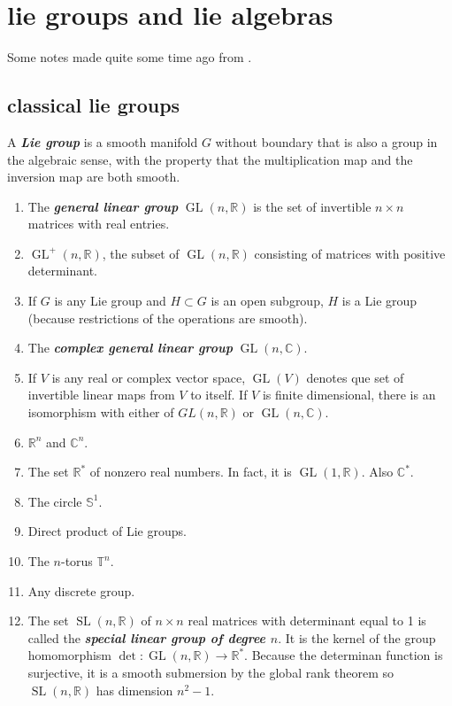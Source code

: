 \chapter{lie groups and lie algebras}

Some notes made quite some time ago from  \cite{les}.

\section{classical lie groups}
\begin{defn}
	A \textbf{\textit{Lie group}} is a smooth manifold $G$ without boundary that is also a group in the algebraic sense, with the property that the multiplication map and the inversion map are both smooth.
\end{defn}
\begin{example}\leavevmode
	\begin{enumerate}
		\item The \textbf{\textit{general linear group}} $\operatorname{GL}(n,\mathbb{R})$ is the set of invertible $n\times n$ matrices with real entries.
		\item $\operatorname{GL}^+(n,\mathbb{R})$, the subset of $\operatorname{GL}(n,\mathbb{R})$ consisting of matrices with positive determinant.
		\item If $G$ is any Lie group and $H\subset G$ is an open subgroup, $H$ is a Lie group (because restrictions of the operations are smooth).
		\item The \textbf{\textit{complex general linear group}} $\operatorname{GL}(n,\mathbb{C})$.
		\item If $V$ is any real or complex vector space, $\operatorname{GL}(V)$ denotes que set of invertible linear maps from $V$ to itself. If $V$ is finite dimensional, there is an isomorphism with either of $GL(n,\mathbb{R})$ or $\operatorname{GL}(n,\mathbb{C})$.
		\item $\mathbb{R}^n$ and $\mathbb{C}^n$.
		\item The set $\mathbb{R}^*$ of nonzero real numbers. In fact, it is $\operatorname{GL}(1,\mathbb{R})$. Also $\mathbb{C}^*$.
		\item The circle $\mathbb{S}^1$.
		\item Direct product of Lie groups.
		\item The $n$-torus $\mathbb{T}^n$.
		\item Any discrete group.
		\item The set $\operatorname{SL}(n,\mathbb{R})$ of $n\times n$ real matrices with determinant equal to 1 is called the \textbf{\textit{special linear group of degree $n$}}. It is the kernel of the group homomorphism $\det:\operatorname{GL}(n,\mathbb{R})\to\mathbb{R}^*$. Because the determinan function is surjective, it is a smooth submersion by the global rank theorem so $\operatorname{SL}(n,\mathbb{R})$ has dimension $n^2-1$.

\end{enumerate}
\end{example}
